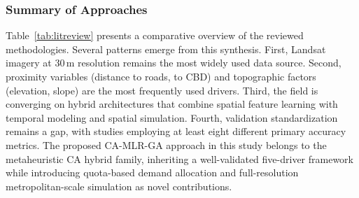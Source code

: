 \documentclass[conference]{IEEEtran}
\begin{document}
\subsubsection{Summary of Approaches}
Table~\ref{tab:litreview} presents a comparative overview of the reviewed methodologies. Several patterns emerge from this synthesis. First, Landsat imagery at 30\,m resolution remains the most widely used data source. Second, proximity variables (distance to roads, to CBD) and topographic factors (elevation, slope) are the most frequently used drivers. Third, the field is converging on hybrid architectures that combine spatial feature learning with temporal modeling and spatial simulation. Fourth, validation standardization remains a gap, with studies employing at least eight different primary accuracy metrics. The proposed CA-MLR-GA approach in this study belongs to the metaheuristic CA hybrid family, inheriting a well-validated five-driver framework while introducing quota-based demand allocation and full-resolution metropolitan-scale simulation as novel contributions.
\end{document}
